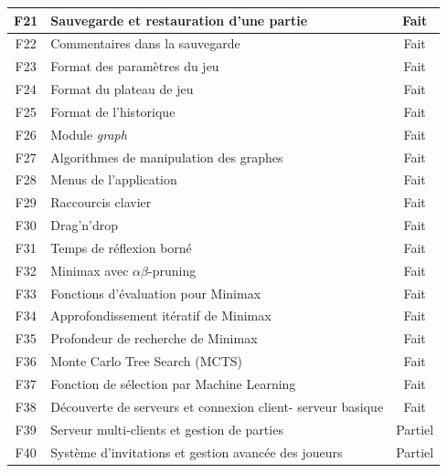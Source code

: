 \documentclass[11pt]{article}
\begin{document}
\begin{longtable}{|c|l|c|}
F21 & Sauvegarde et restauration d'une partie & Fait \\ \hline
F22 & Commentaires dans la sauvegarde & Fait \\ \hline
F23 & Format des paramètres du jeu & Fait \\ \hline
F24 & Format du plateau de jeu & Fait \\ \hline
F25 & Format de l'historique & Fait \\ \hline

F26 & Module \textit{graph} & Fait \\ \hline
F27 & Algorithmes de manipulation des graphes & Fait \\ \hline

F28 & Menus de l'application & Fait \\ \hline
F29 & Raccourcis clavier & Fait \\ \hline
F30 & Drag'n'drop & Fait \\ \hline

F31 & Temps de réflexion borné & Fait \\ \hline
F32 & Minimax avec $\alpha$$\beta$-pruning & Fait \\ \hline
F33 & Fonctions d'évaluation pour Minimax & Fait \\ \hline
F34 & Approfondissement itératif de Minimax & Fait \\ \hline
F35 & Profondeur de recherche de Minimax & Fait \\ \hline
F36 & Monte Carlo Tree Search (MCTS) & Fait \\ \hline
F37 & Fonction de sélection par Machine Learning & Fait \\ \hline

F38 & Découverte de serveurs et connexion client-
serveur basique & Fait \\ \hline
F39 & Serveur multi-clients et gestion de parties & Partiel \\ \hline
F40 & Système d'invitations et gestion avancée des
joueurs & Partiel \\ \hline

\end{longtable}
\end{document}
